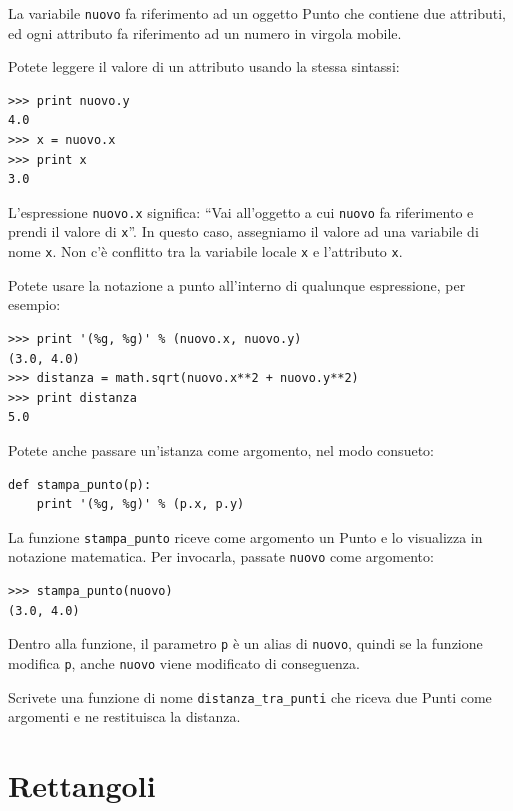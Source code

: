 \documentclass[10pt]{book}
\begin{document}
La variabile {\tt nuovo} fa riferimento ad un oggetto Punto che contiene due
   attributi, ed ogni attributo fa riferimento ad un numero in virgola mobile.

Potete leggere il valore di un attributo usando la stessa sintassi:

\begin{verbatim}
>>> print nuovo.y
4.0
>>> x = nuovo.x
>>> print x
3.0
\end{verbatim}
%
L'espressione {\tt nuovo.x} significa: ``Vai all'oggetto a cui {\tt nuovo}
fa riferimento e prendi il valore di {\tt x}''. In questo caso, assegniamo il valore ad  una variabile di nome {\tt x}. Non c'è conflitto tra la variabile locale {\tt x} e l'attributo {\tt x}.

Potete usare la notazione a punto all'interno di qualunque espressione, per esempio:

\begin{verbatim}
>>> print '(%g, %g)' % (nuovo.x, nuovo.y)
(3.0, 4.0)
>>> distanza = math.sqrt(nuovo.x**2 + nuovo.y**2)
>>> print distanza
5.0
\end{verbatim}
%
Potete anche passare un'istanza come argomento, nel modo consueto:

\begin{verbatim}
def stampa_punto(p):
    print '(%g, %g)' % (p.x, p.y)
\end{verbatim}
%
La funzione \verb"stampa_punto" riceve come argomento un Punto e lo visualizza in notazione matematica. Per invocarla, passate {\tt nuovo} come argomento:

\begin{verbatim}
>>> stampa_punto(nuovo)
(3.0, 4.0)
\end{verbatim}
%
Dentro alla funzione, il parametro {\tt p} è un alias di {\tt nuovo}, quindi se la funzione modifica {\tt p}, anche {\tt nuovo} viene modificato di conseguenza.

\vspace{0.2in}
\begin{exercise}

Scrivete una funzione di nome \verb"distanza_tra_punti" che riceva due Punti come argomenti e ne restituisca la distanza.

\end{exercise}



\section{Rettangoli}
\label{rectangles}
\end{document}
